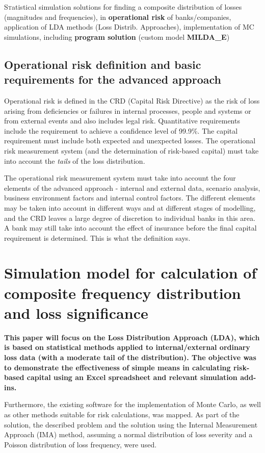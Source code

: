 \documentclass{article}
\begin{document}
\lettrine[nindent=0em,lines=3]{S} tatistical simulation solutions for finding a composite distribution of losses (magnitudes and frequencies), in \textbf{operational risk} of banks/companies, application of LDA methods (Loss Distrib. Approaches), implementation of MC simulations, including \textbf{program solution} (custom model \textbf{MILDA\_E})


\subsection{Operational risk definition and basic requirements for the advanced approach}

Operational risk is defined in the CRD (Capital Risk Directive) as the risk of loss arising from deficiencies or failures in internal processes, people and systems or from external events and also includes legal risk. Quantitative requirements include the requirement to achieve a confidence level of 99.9\%. The capital requirement must include both expected and unexpected losses. The operational risk measurement system (and the determination of risk-based capital) must take into account the \emph{tails} of the loss distribution.

The operational risk measurement system must take into account the four elements of the advanced approach - internal and external data, scenario analysis, business environment factors and internal control factors. The different elements may be taken into account in different ways and at different stages of modelling, and the CRD leaves a large degree of discretion to individual banks in this area. A bank may still take into account the effect of insurance before the final capital requirement is determined. This is what the definition says.




\section{Simulation model for calculation of composite frequency distribution and loss significance}

\textbf{This paper will focus on the Loss Distribution Approach (LDA), which is based on statistical methods applied to internal/external ordinary loss data (with a moderate tail of the distribution). The objective was to demonstrate the effectiveness of simple means in calculating risk-based capital using an Excel spreadsheet and relevant simulation add-ins.}

Furthermore, the existing software for the implementation of Monte Carlo, as well as other methods suitable for risk calculations, was mapped.
As part of the solution, the described problem and the solution using the Internal Measurement Approach (IMA) method, assuming a normal distribution of loss severity and a Poisson distribution of loss frequency, were used.
\end{document}

